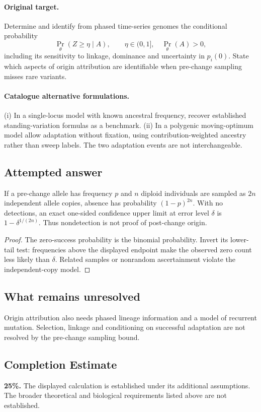 \documentclass[11pt]{article}
\begin{document}
\paragraph{Original target.}
Determine and identify from phased time-series genomes the conditional probability
\[
 \Pr_\theta(Z\ge\eta\mid A),\qquad
 \eta\in(0,1],\quad\Pr_\theta(A)>0,
\]
including its sensitivity to linkage, dominance and uncertainty in $p_i(0)$. State which aspects of origin attribution are identifiable when pre-change sampling misses rare variants.
\paragraph{Catalogue alternative formulations.}
(i) In a single-locus model with known ancestral frequency, recover established standing-variation formulas as a benchmark. (ii) In a polygenic moving-optimum model allow adaptation without fixation, using contribution-weighted ancestry rather than sweep labels. The two adaptation events are not interchangeable.
\subsection{Attempted answer}
\begin{proposition}
If a pre-change allele has frequency $p$ and $n$ diploid individuals are sampled as $2n$ independent allele copies, absence has probability $(1-p)^{2n}$. With no detections, an exact one-sided confidence upper limit at error level $\delta$ is $1-\delta^{1/(2n)}$. Thus nondetection is not proof of post-change origin.
\end{proposition}
\begin{proof}
The zero-success probability is the binomial probability. Invert its lower-tail test: frequencies above the displayed endpoint make the observed zero count less likely than $\delta$. Related samples or nonrandom ascertainment violate the independent-copy model.
\end{proof}
\subsection{What remains unresolved}
Origin attribution also needs phased lineage information and a model of recurrent mutation. Selection, linkage and conditioning on successful adaptation are not resolved by the pre-change sampling bound.
\subsection{Completion Estimate}
\textbf{25\%.} The displayed calculation is established under its additional assumptions. The broader theoretical and biological requirements listed above are not established.
\end{document}
